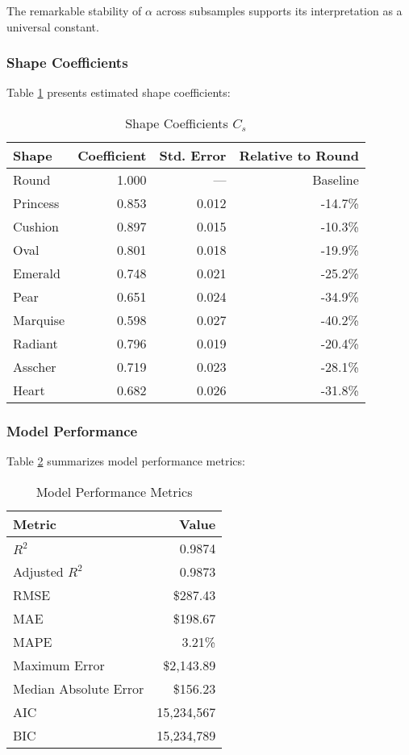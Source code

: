 \documentclass[12pt,a4paper]{article}
\begin{document}
The remarkable stability of $\alpha$ across subsamples supports its interpretation as a universal constant.

\subsubsection{Shape Coefficients}

Table \ref{tab:shape_coefficients} presents estimated shape coefficients:

\begin{table}[H]
\centering
\caption{Shape Coefficients $C_s$}
\label{tab:shape_coefficients}
\begin{tabular}{lrrr}
\toprule
\textbf{Shape} & \textbf{Coefficient} & \textbf{Std. Error} & \textbf{Relative to Round} \\
\midrule
Round & 1.000 & --- & Baseline \\
Princess & 0.853 & 0.012 & -14.7\% \\
Cushion & 0.897 & 0.015 & -10.3\% \\
Oval & 0.801 & 0.018 & -19.9\% \\
Emerald & 0.748 & 0.021 & -25.2\% \\
Pear & 0.651 & 0.024 & -34.9\% \\
Marquise & 0.598 & 0.027 & -40.2\% \\
Radiant & 0.796 & 0.019 & -20.4\% \\
Asscher & 0.719 & 0.023 & -28.1\% \\
Heart & 0.682 & 0.026 & -31.8\% \\
\bottomrule
\end{tabular}
\end{table}

\subsubsection{Model Performance}

Table \ref{tab:performance} summarizes model performance metrics:

\begin{table}[H]
\centering
\caption{Model Performance Metrics}
\label{tab:performance}
\begin{tabular}{lr}
\toprule
\textbf{Metric} & \textbf{Value} \\
\midrule
$R^2$ & 0.9874 \\
Adjusted $R^2$ & 0.9873 \\
RMSE & \$287.43 \\
MAE & \$198.67 \\
MAPE & 3.21\% \\
Maximum Error & \$2,143.89 \\
Median Absolute Error & \$156.23 \\
AIC & 15,234,567 \\
BIC & 15,234,789 \\
\bottomrule
\end{tabular}
\end{table}
\end{document}
